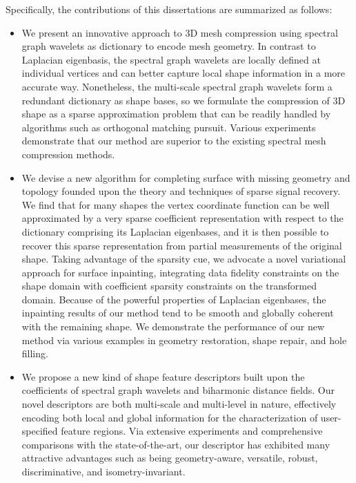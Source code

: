 Specifically, the contributions of this dissertations are summarized as follows:

\begin{itemize}
\item We present an innovative approach to 3D mesh compression using spectral graph
wavelets as dictionary to encode mesh geometry. In contrast to
Laplacian eigenbasis, the spectral graph wavelets are locally
defined at individual vertices and can better capture local shape
information in a more accurate way. Nonetheless, the multi-scale
spectral graph wavelets form a redundant dictionary as shape bases,
so we formulate the compression of 3D shape as a sparse
approximation problem that can be readily handled by
algorithms such as orthogonal matching pursuit. Various experiments
demonstrate that our method are superior to the existing spectral
mesh compression methods.

\item  We devise a new algorithm for completing surface with
  missing geometry and topology founded upon the theory and techniques
  of sparse signal recovery. We find that for many shapes the vertex coordinate function
  can be well approximated by a very sparse coefficient representation with respect
  to the dictionary comprising its Laplacian eigenbases, and it is then possible to
  recover this sparse representation from partial measurements of the original shape.
  Taking advantage of the sparsity cue, we advocate a novel
  variational approach for surface inpainting, integrating data
  fidelity constraints on the shape domain with coefficient sparsity
  constraints on the transformed domain. Because of the powerful
  properties of Laplacian eigenbases, the inpainting results of our
  method tend to be smooth and globally coherent with the remaining
  shape. We demonstrate the performance of our new method via various
  examples in geometry restoration, shape repair, and hole filling.

\item We propose a new kind of shape feature descriptors built upon the
  coefficients of spectral graph wavelets and biharmonic distance fields. 
  Our novel descriptors are both multi-scale and multi-level in nature, 
  effectively encoding both local and global information 
  for the characterization of user-specified feature regions. 
  Via extensive experiments and comprehensive comparisons with the state-of-the-art, 
  our descriptor has exhibited many attractive advantages such as being geometry-aware, 
  versatile, robust, discriminative, and isometry-invariant.


\end{itemize}
